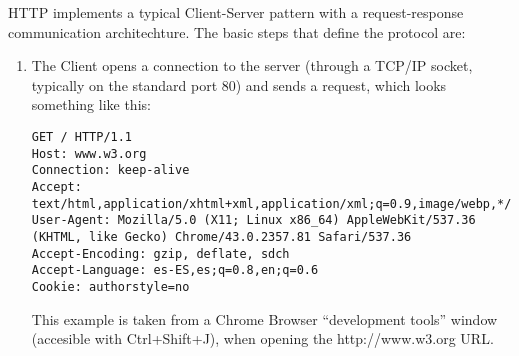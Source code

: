 HTTP implements a typical Client-Server pattern with a request-response communication architechture. The basic steps that define the protocol are:
\begin{enumerate}
\item The Client opens a connection to the server (through a TCP/IP socket, typically on the standard port 80) and sends a request, which looks something like this:
\begin{verbatim}
GET / HTTP/1.1
Host: www.w3.org
Connection: keep-alive
Accept: text/html,application/xhtml+xml,application/xml;q=0.9,image/webp,*/*;q=0.8
User-Agent: Mozilla/5.0 (X11; Linux x86_64) AppleWebKit/537.36 (KHTML, like Gecko) Chrome/43.0.2357.81 Safari/537.36
Accept-Encoding: gzip, deflate, sdch
Accept-Language: es-ES,es;q=0.8,en;q=0.6
Cookie: authorstyle=no
\end{verbatim}
This example is taken from a Chrome Browser ``development tools'' window (accesible with Ctrl+Shift+J), when opening the http://www.w3.org URL.\\


\end{enumerate}
